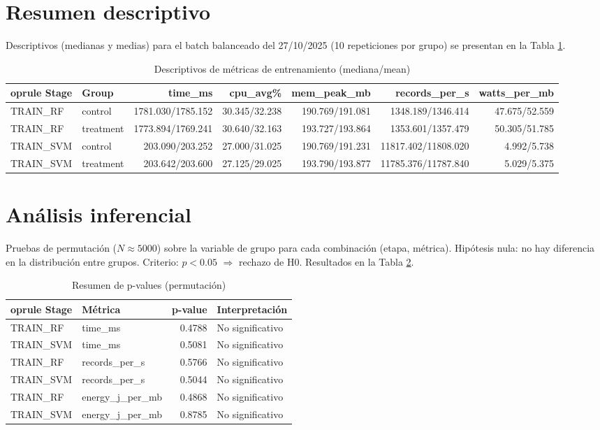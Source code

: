 \documentclass[12pt,oneside]{report}
\begin{document}
    \section{Resumen descriptivo}
    Descriptivos (medianas y medias) para el batch balanceado del 27/10/2025 (10 repeticiones por grupo) se presentan en la Tabla \ref{tab:descriptivos}.
    \begin{table}[htbp]
    \centering
    \caption{Descriptivos de métricas de entrenamiento (mediana/mean)}
    \label{tab:descriptivos}
    \begin{tabular}{l l r r r r r}
    	oprule
    Stage & Group & time\_ms & cpu\_avg\% & mem\_peak\_mb & records\_per\_s & watts\_per\_mb \\
    \midrule
    TRAIN\_RF & control & 1781.030/1785.152 & 30.345/32.238 & 190.769/191.081 & 1348.189/1346.414 & 47.675/52.559 \\
    TRAIN\_RF & treatment & 1773.894/1769.241 & 30.640/32.163 & 193.727/193.864 & 1353.601/1357.479 & 50.305/51.785 \\
    TRAIN\_SVM & control & 203.090/203.252 & 27.000/31.025 & 190.769/191.231 & 11817.402/11808.020 & 4.992/5.738 \\
    TRAIN\_SVM & treatment & 203.642/203.600 & 27.125/29.025 & 193.790/193.877 & 11785.376/11787.840 & 5.029/5.375 \\
    \bottomrule
    \end{tabular}
    \end{table}

    \section{Análisis inferencial}
    Pruebas de permutación (\(N \approx 5000\)) sobre la variable de grupo para cada combinación (etapa, métrica). Hipótesis nula: no hay diferencia en la distribución entre grupos. Criterio: \(p < 0.05\) \(\Rightarrow\) rechazo de H0. Resultados en la Tabla \ref{tab:pvalues}.
    \begin{table}[htbp]
    \centering
    \caption{Resumen de p-values (permutación)}
    \label{tab:pvalues}
    \begin{tabular}{l l r l}
    	oprule
    Stage & Métrica & p-value & Interpretación \\
    \midrule
    TRAIN\_RF & time\_ms & 0.4788 & No significativo \\
    TRAIN\_SVM & time\_ms & 0.5081 & No significativo \\
    TRAIN\_RF & records\_per\_s & 0.5766 & No significativo \\
    TRAIN\_SVM & records\_per\_s & 0.5044 & No significativo \\
    TRAIN\_RF & energy\_j\_per\_mb & 0.4868 & No significativo \\
    TRAIN\_SVM & energy\_j\_per\_mb & 0.8785 & No significativo \\
    \bottomrule
    \end{tabular}
    \end{table}
\end{document}
